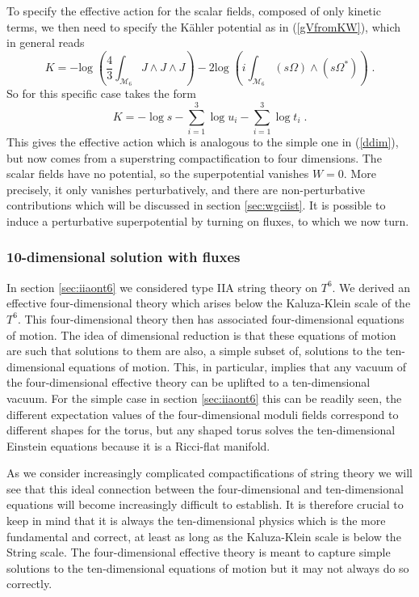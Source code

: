\documentclass[11pt,a4paper]{article}
\numberwithin{equation}{section}
\numberwithin{table}{section}\setlength{\multlinegap}{25pt}
\newcommand{\cM}{\mathcal M}
\newcommand{\be}{\begin{equation}}
\newcommand{\ee}{\end{equation}}
\begin{document}
To specify the effective action for the scalar fields, composed of only kinetic terms, we then need to specify the K{\"a}hler potential as in (\ref{gVfromKW}), which in general reads \cite{Grimm:2004ua} 
\be
K = - \mathrm{log\;} \left(\frac43 \int_{\cM_6} J \wedge J \wedge J \right) - 2\mathrm{log\;} \left( i \int_{\cM_6} \left(s\Omega\right) \wedge \left(s\Omega^*\right) \right) \;.
\label{gen10ea}
\ee
So for this specific case takes the form
\be
\label{kpott6}
K = - \log s - \sum_{i=1}^3 \log u_i - \sum_{i=1}^3 \log t_i \;. 
\ee
This gives the effective action which is analogous to the simple one in (\ref{ddim}), but now comes from a superstring compactification  to four dimensions. The scalar fields have no potential, so the superpotential vanishes $W=0$. More precisely, it only vanishes perturbatively, and there are non-perturbative contributions which will be discussed in section \ref{sec:wgciist}. It is possible to induce a perturbative superpotential by turning on fluxes, to which we now turn.

\subsubsection{10-dimensional solution with fluxes}
\label{sec:10diiaflux}

In section \ref{sec:iiaont6} we considered type IIA string theory on $T^6$. We derived an effective four-dimensional theory which arises below the Kaluza-Klein scale of the $T^6$. This four-dimensional theory then has associated four-dimensional equations of motion. The idea of dimensional reduction is that these equations of motion are such that solutions to them are also, a simple subset of, solutions to the ten-dimensional equations of motion. This, in particular, implies that any vacuum of the four-dimensional effective theory can be uplifted to a ten-dimensional vacuum. For the simple case in section \ref{sec:iiaont6} this can be readily seen, the different expectation values of the four-dimensional moduli fields correspond to different shapes for the torus, but any shaped torus solves the ten-dimensional Einstein equations because it is a Ricci-flat manifold. 

As we consider increasingly complicated compactifications of string theory we will see that this ideal connection between the four-dimensional and ten-dimensional equations will become increasingly difficult to establish. It is therefore crucial to keep in mind that it is always the ten-dimensional physics which is the more fundamental and correct, at least as long as the Kaluza-Klein scale is below the String scale. The four-dimensional effective theory is meant to capture simple solutions to the ten-dimensional equations of motion but it may not always do so correctly. 
\end{document}
